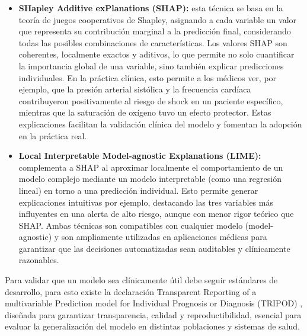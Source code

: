 \begin{itemize}
    \item \textbf{SHapley Additive exPlanations (SHAP):} esta técnica se basa en la teoría de juegos cooperativos de Shapley, asignando a cada variable un valor que representa su contribución marginal a la predicción final, considerando todas las posibles combinaciones de características. Los valores SHAP son coherentes, localmente exactos y aditivos, lo que permite no solo cuantificar la importancia global de una variable, sino también explicar predicciones individuales. En la práctica clínica, esto permite a los médicos ver, por ejemplo, que la presión arterial sistólica y la frecuencia cardíaca contribuyeron positivamente al riesgo de shock en un paciente específico, mientras que la saturación de oxígeno tuvo un efecto protector. Estas explicaciones facilitan la validación clínica del modelo y fomentan la adopción en la práctica real.

    \item \textbf{Local Interpretable Model-agnostic Explanations (LIME):} complementa a SHAP al aproximar localmente el comportamiento de un modelo complejo mediante un modelo interpretable (como una regresión lineal) en torno a una predicción individual. Esto permite generar explicaciones intuitivas por ejemplo, destacando las tres variables más influyentes en una alerta de alto riesgo, aunque con menor rigor teórico que SHAP. Ambas técnicas son compatibles con cualquier modelo (model-agnostic) y son ampliamente utilizadas en aplicaciones médicas para garantizar que las decisiones automatizadas sean auditables y clínicamente razonables.
\end{itemize}

Para validar que un modelo sea clínicamente útil debe seguir estándares de desarrollo, para esto existe la declaración Transparent Reporting of a multivariable Prediction model for Individual Prognosis or Diagnosis (TRIPOD) \cite{collins2015}, diseñada para garantizar transparencia, calidad y reproductibilidad, esencial para evaluar la generalización del modelo en distintas poblaciones y sistemas de salud.

\newpage


